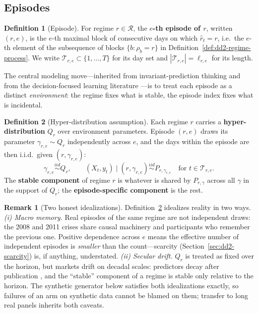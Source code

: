 \documentclass[11pt,a4paper]{article}
\theoremstyle{definition}
\newtheorem{definition}{Definition}[section]
\newtheorem{remark}{Remark}[section]
\theoremstyle{plain}
\begin{document}
\subsection{Episodes}

\begin{definition}[Episode]
\label{def:dd2-episode}
For regime $r \in \mathcal{R}$, the \textbf{$e$-th episode of $r$}, written
$(r, e)$, is the $e$-th maximal block of consecutive days on which
$\hat r_t = r$, i.e.\ the $e$-th element of the subsequence of blocks
$\{b : \rho_b = r\}$ in Definition~\ref{def:dd2-regime-process}. We write
$\mathcal{T}_{r,e} \subset \{1, \ldots, T\}$ for its day set and
$|\mathcal{T}_{r,e}| = \ell_{r,e}$ for its length.
\end{definition}

The central modeling move---inherited from invariant-prediction thinking and
from the decision-focused learning literature
\citep{elmachtoub2022smart, yan2026invpnco}---is to treat each episode as a
distinct \emph{environment}: the regime fixes what is stable, the episode
index fixes what is incidental.

\begin{definition}[Hyper-distribution assumption]
\label{def:dd2-hyper}
Each regime $r$ carries a \textbf{hyper-distribution} $Q_r$ over environment
parameters. Episode $(r,e)$ draws its parameter
$\gamma_{r,e} \sim Q_r$ independently across $e$, and the days within the
episode are then i.i.d.\ given $(r, \gamma_{r,e})$:
\[
\gamma_{r,e} \stackrel{iid}{\sim} Q_r, \qquad
(X_t, y_t) \mid (r, \gamma_{r,e}) \stackrel{iid}{\sim} P_{r, \gamma_{r,e}}
\quad \text{for } t \in \mathcal{T}_{r,e}.
\]
The \textbf{stable component} of regime $r$ is whatever is shared by
$P_{r,\gamma}$ across all $\gamma$ in the support of $Q_r$; the
\textbf{episode-specific component} is the rest.
\end{definition}

\begin{remark}[Two honest idealizations]
\label{rem:dd2-idealizations}
Definition~\ref{def:dd2-hyper} idealizes reality in two ways.
\emph{(i) Macro memory.} Real episodes of the same regime are not independent
draws: the 2008 and 2011 crises share causal machinery and participants who
remember the previous one. Positive dependence across $e$ means the effective
number of independent episodes is \emph{smaller} than the count---scarcity
(Section~\ref{sec:dd2-scarcity}) is, if anything, understated.
\emph{(ii) Secular drift.} $Q_r$ is treated as fixed over the horizon, but
markets drift on decadal scales: predictors decay after publication
\citep{mclean2016does}, and the ``stable'' component of a regime is stable
only relative to the horizon. The synthetic generator below satisfies both
idealizations exactly, so failures of an arm on synthetic data cannot be
blamed on them; transfer to long real panels inherits both caveats.
\end{remark}
\end{document}
